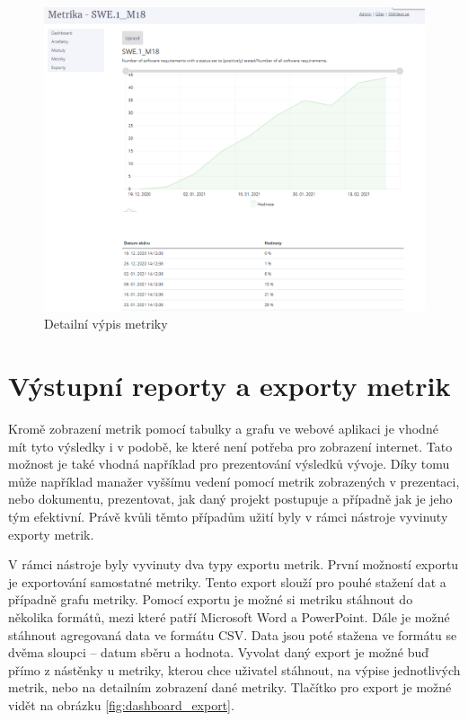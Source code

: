\documentclass[czech,master]{diploma}
\begin{document}
\begin{figure}[!ht]
    \centering
    \includegraphics[width=1\textwidth]{Diplomka/Figures/metric_detail.png}
    \caption{Detailní výpis metriky}
    \label{fig:metric_detail}
\end{figure}


\section{Výstupní reporty a exporty metrik}
\label{sec:reports}
Kromě zobrazení metrik pomocí tabulky a grafu ve webové aplikaci je vhodné mít tyto výsledky i v podobě, ke které není potřeba pro zobrazení internet. Tato možnost je také vhodná například pro prezentování výsledků vývoje. Díky tomu může například manažer vyššímu vedení pomocí metrik zobrazených v prezentaci, nebo dokumentu, prezentovat, jak daný projekt postupuje a případně jak je jeho tým efektivní. Právě kvůli těmto případům užití byly v rámci nástroje vyvinuty exporty metrik.

V rámci nástroje byly vyvinuty dva typy exportu metrik. První možností exportu je exportování samostatné metriky. Tento export slouží pro pouhé stažení dat a případně grafu metriky. Pomocí exportu je možné si metriku stáhnout do několika formátů, mezi které patří Microsoft Word a PowerPoint. Dále je možné stáhnout agregovaná data ve formátu CSV. Data jsou poté stažena ve formátu se dvěma sloupci -- datum sběru a hodnota. Vyvolat daný export je možné buď přímo z nástěnky u metriky, kterou chce uživatel stáhnout, na výpise jednotlivých metrik, nebo na detailním zobrazení dané metriky. Tlačítko pro export je možné vidět na obrázku \ref{fig:dashboard_export}.
\end{document}
